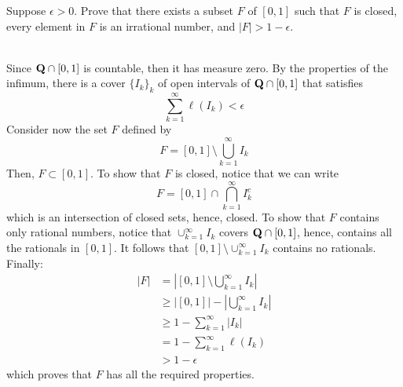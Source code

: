\begin{exercise}
    Suppose $\epsilon > 0$. Prove that there exists a subset $F$ of $[0,1]$ such that $F$ is closed, every element in $F$ is an irrational number, and $|F| > 1 - \epsilon$. \\
\end{exercise}

\begin{solution}
    \\ Since $\mathbf{Q} \cap [0,1]$ is countable, then it has measure zero. By the properties of the infimum, there is a cover $\{I_k\}_k$ of open intervals of $\mathbf{Q} \cap [0,1]$ that satisfies 
    $$\sum_{k=1}^{\infty}\ell(I_k) < \epsilon$$
    Consider now the set $F$ defined by
    $$F = [0,1] \setminus \bigcup_{k=1}^{\infty}I_k$$
    Then, $F \subset [0,1]$. To show that $F$ is closed, notice that we can write
    $$F = [0,1] \cap \bigcap_{k=1}^{\infty}I_k^c$$
    which is an intersection of closed sets, hence, closed. To show that $F$ contains only rational numbers, notice that $\cup_{k=1}^{\infty}I_k$ covers $\mathbf{Q} \cap [0,1]$, hence, contains all the rationals in $[0,1]$. It follows that $[0,1] \setminus \cup_{k=1}^{\infty}I_k$ contains no rationals. Finally:
    \begin{align*}
        |F| &= \left| [0,1] \setminus \bigcup_{k=1}^{\infty}I_k \right| \\
        &\geq |[0,1]| - \left|\bigcup_{k=1}^{\infty}I_k \right| \\
        &\geq 1 - \sum_{k=1}^{\infty}|I_k| \\
        &= 1 - \sum_{k=1}^{\infty}\ell(I_k) \\
        &> 1 - \epsilon
    \end{align*}
    which proves that $F$ has all the required properties. \\
\end{solution}

